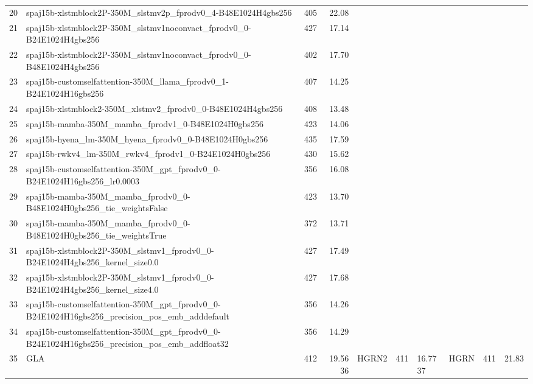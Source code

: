 \begin{tabular}{llrr}
20 & spaj15b-xlstmblock2P-350M_slstmv2p_fprodv0_4-B48E1024H4gbs256 & 405 & 22.08 \\
21 & spaj15b-xlstmblock2P-350M_slstmv1noconvact_fprodv0_0-B24E1024H4gbs256 & 427 & 17.14 \\
22 & spaj15b-xlstmblock2P-350M_slstmv1noconvact_fprodv0_0-B48E1024H4gbs256 & 402 & 17.70 \\
23 & spaj15b-customselfattention-350M_llama_fprodv0_1-B24E1024H16gbs256 & 407 & 14.25 \\
24 & spaj15b-xlstmblock2-350M_xlstmv2_fprodv0_0-B48E1024H4gbs256 & 408 & 13.48 \\
25 & spaj15b-mamba-350M_mamba_fprodv1_0-B48E1024H0gbs256 & 423 & 14.06 \\
26 & spaj15b-hyena_lm-350M_hyena_fprodv0_0-B48E1024H0gbs256 & 435 & 17.59 \\
27 & spaj15b-rwkv4_lm-350M_rwkv4_fprodv1_0-B24E1024H0gbs256 & 430 & 15.62 \\
28 & spaj15b-customselfattention-350M_gpt_fprodv0_0-B24E1024H16gbs256_lr0.0003 & 356 & 16.08 \\
29 & spaj15b-mamba-350M_mamba_fprodv0_0-B48E1024H0gbs256_tie_weightsFalse & 423 & 13.70 \\
30 & spaj15b-mamba-350M_mamba_fprodv0_0-B48E1024H0gbs256_tie_weightsTrue & 372 & 13.71 \\
31 & spaj15b-xlstmblock2P-350M_slstmv1_fprodv0_0-B24E1024H4gbs256_kernel_size0.0 & 427 & 17.49 \\
32 & spaj15b-xlstmblock2P-350M_slstmv1_fprodv0_0-B24E1024H4gbs256_kernel_size4.0 & 427 & 17.68 \\
33 & spaj15b-customselfattention-350M_gpt_fprodv0_0-B24E1024H16gbs256_precision_pos_emb_adddefault & 356 & 14.26 \\
34 & spaj15b-customselfattention-350M_gpt_fprodv0_0-B24E1024H16gbs256_precision_pos_emb_addfloat32 & 356 & 14.29 \\
35 & GLA & 412& 19.56
36 & HGRN2 & 411& 16.77
37 & HGRN & 411 & 21.83
\bottomrule
\caption{xLSTM Benchmark Models Val PPL}
\end{tabular}
